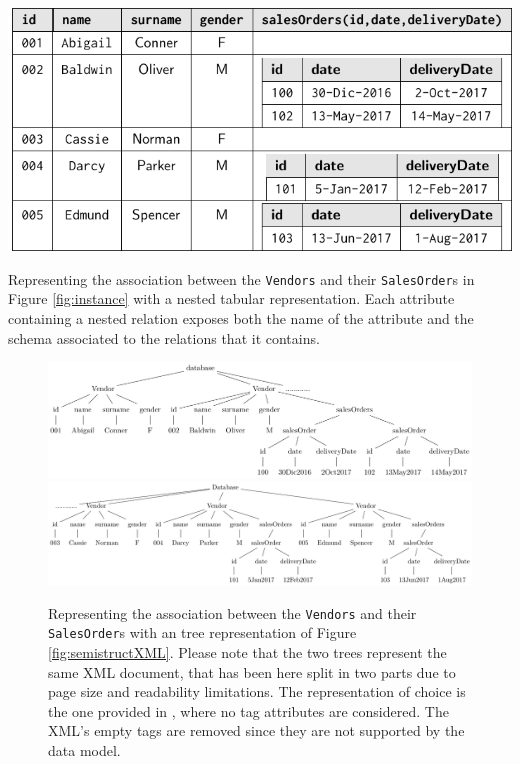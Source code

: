 \begin{table}[!t]
\centering
\includegraphics[scale=0.9]{fig/02models/01nestedaggr}
\caption{Representing the association between the \texttt{Vendors} and their \texttt{SalesOrder}s in Figure \ref{fig:instance} with a nested tabular representation. Each attribute containing a nested relation exposes both the name of the attribute and the schema associated to the relations that it contains. }
\label{tab:semistructTable}
\end{table}\begin{figure}[!t]
\includegraphics[scale=0.7]{fig/02models/02anestedasTree.pdf}
\includegraphics[scale=0.63]{fig/02models/02bnestedasTree.pdf}
\caption{Representing the association between the \texttt{Vendors} and their \texttt{SalesOrder}s with an tree representation of Figure \ref{fig:semistructXML}. Please note that the two trees represent the same XML document, that has been here split in two parts due to page size and readability limitations. The representation of choice is the one provided in \cite{Magnani06}, where no tag attributes are considered. The XML's empty tags are removed since they are not supported by the data model.}
\label{fig:semistructXMLTree}
\end{figure}

